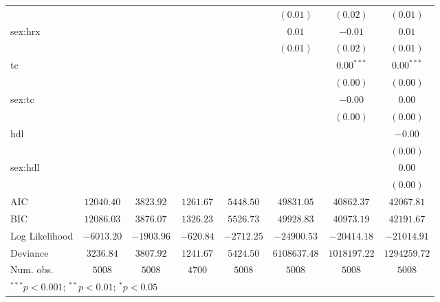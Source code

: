 \begin{tabular}{l c c c c c c c}
                     &               &                &               &               & $(0.01)$      & $(0.02)$      & $(0.01)$      \\
sex:hrx              &               &                &               &               & $0.01$        & $-0.01$       & $0.01$        \\
                     &               &                &               &               & $(0.01)$      & $(0.02)$      & $(0.01)$      \\
tc                   &               &                &               &               &               & $0.00^{***}$  & $0.00^{***}$  \\
                     &               &                &               &               &               & $(0.00)$      & $(0.00)$      \\
sex:tc               &               &                &               &               &               & $-0.00$       & $0.00$        \\
                     &               &                &               &               &               & $(0.00)$      & $(0.00)$      \\
hdl                  &               &                &               &               &               &               & $-0.00$       \\
                     &               &                &               &               &               &               & $(0.00)$      \\
sex:hdl              &               &                &               &               &               &               & $0.00$        \\
                     &               &                &               &               &               &               & $(0.00)$      \\
\midrule
AIC                  & $12040.40$    & $3823.92$      & $1261.67$     & $5448.50$     & $49831.05$    & $40862.37$    & $42067.81$    \\
BIC                  & $12086.03$    & $3876.07$      & $1326.23$     & $5526.73$     & $49928.83$    & $40973.19$    & $42191.67$    \\
Log Likelihood       & $-6013.20$    & $-1903.96$     & $-620.84$     & $-2712.25$    & $-24900.53$   & $-20414.18$   & $-21014.91$   \\
Deviance             & $3236.84$     & $3807.92$      & $1241.67$     & $5424.50$     & $6108637.48$  & $1018197.22$  & $1294259.72$  \\
Num. obs.            & $5008$        & $5008$         & $4700$        & $5008$        & $5008$        & $5008$        & $5008$        \\
\bottomrule
\multicolumn{8}{l}{\scriptsize{$^{***}p<0.001$; $^{**}p<0.01$; $^{*}p<0.05$}}
\end{tabular}
